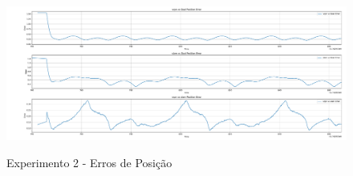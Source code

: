 \begin{figure}
    \centering
    \caption{Experimento 2 - Erros de Posição}
    \includegraphics[width=\linewidth]{img/Resultados/Exp2_VRPN_Control_LEMNISCATA/Erros_Posicao.pdf}
    \label{fig:Exp2_Erros_Posicao}
\end{figure}
